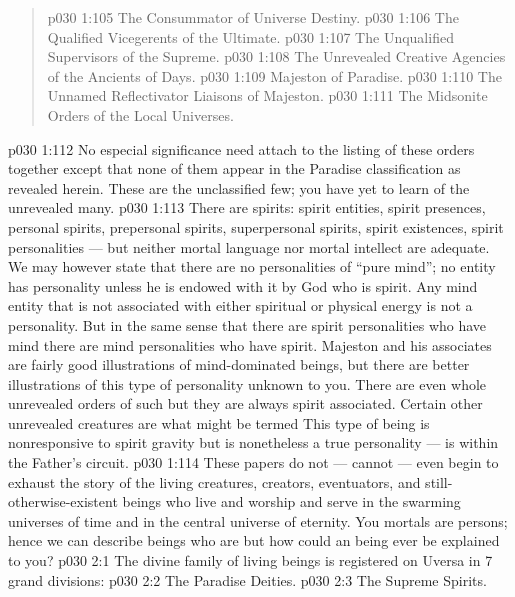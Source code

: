 \begin{quote}
\vs p030 1:105 The Consummator of Universe Destiny.
\vs p030 1:106 The Qualified Vicegerents of the Ultimate.
\vs p030 1:107 The Unqualified Supervisors of the Supreme.
\vs p030 1:108 The Unrevealed Creative Agencies of the Ancients of Days.
\vs p030 1:109 Majeston of Paradise.
\vs p030 1:110 The Unnamed Reflectivator Liaisons of Majeston.
\vs p030 1:111 The Midsonite Orders of the Local Universes.
\end{quote}
\vs p030 1:112 \pc No especial significance need attach to the listing of these orders together except that none of them appear in the Paradise classification as revealed herein. These are the unclassified few; you have yet to learn of the unrevealed many.
\vs p030 1:113 There are spirits: spirit entities, spirit presences, personal spirits, prepersonal spirits, superpersonal spirits, spirit existences, spirit personalities --- but neither mortal language nor mortal intellect are adequate. We may however state that there are no personalities of “pure mind”; no entity has personality unless he is endowed with it by God who is spirit. Any mind entity that is not associated with either spiritual or physical energy is not a personality. But in the same sense that there are spirit personalities who have mind there are mind personalities who have spirit. Majeston and his associates are fairly good illustrations of mind\hyp{}dominated beings, but there are better illustrations of this type of personality unknown to you. There are even whole unrevealed orders of such  but they are always spirit associated. Certain other unrevealed creatures are what might be termed  This type of being is nonresponsive to spirit gravity but is nonetheless a true personality --- is within the Father’s circuit.
\vs p030 1:114 \pc These papers do not --- cannot --- even begin to exhaust the story of the living creatures, creators, eventuators, and still\hyp{}otherwise\hyp{}existent beings who live and worship and serve in the swarming universes of time and in the central universe of eternity. You mortals are persons; hence we can describe beings who are  but how could an  being ever be explained to you?
\vs p030 2:1 The divine family of living beings is registered on Uversa in 7 grand divisions:
\vs p030 2:2 \bibnobreakspace The Paradise Deities.
\vs p030 2:3 \bibnobreakspace The Supreme Spirits.
